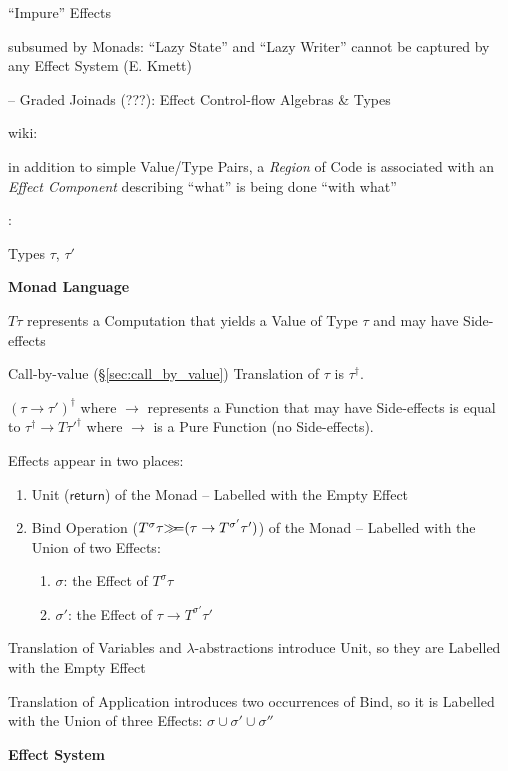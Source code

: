 ``Impure'' Effects

subsumed by Monads: ``Lazy State'' and ``Lazy Writer'' cannot be
captured by any Effect System (E. Kmett)

\cite{mycroft-orchard-petricek16} -- Graded Joinads (???): Effect
Control-flow Algebras \& Types

wiki:

in addition to simple Value/Type Pairs, a \emph{Region} of Code is
associated with an \emph{Effect Component} describing ``what'' is
being done ``with what''


\asterism


\cite{wadler-thiemann03}:

Types $\tau$, $\tau'$


\textbf{Monad Language}

$T \tau$ represents a Computation that yields a Value
of Type $\tau$ and may have Side-effects

Call-by-value (\S\ref{sec:call_by_value}) Translation of $\tau$ is
$\tau^\dag$.

$(\tau \rightarrow \tau')^\dag$ where $\rightarrow$ represents a
Function that may have Side-effects is equal to $\tau^\dag \rightarrow
T \tau'^\dag$ where $\rightarrow$ is a Pure Function (no Side-effects).

Effects appear in two places:
\begin{enumerate}
  \item Unit ($\mathsf{return}$) of the Monad -- Labelled with the
    Empty Effect
  \item Bind Operation ($T^\sigma\tau \mathsf{\gg\kern-3pt=} (\tau \rightarrow
    T^{\sigma'}\tau')$) of the Monad -- Labelled with the Union of two
    Effects: %
    \begin{enumerate}
      \item $\sigma$: the Effect of $T^\sigma\tau$
      \item $\sigma'$: the Effect of $\tau \rightarrow
        T^{\sigma'}\tau'$
    \end{enumerate}
\end{enumerate}

Translation of Variables and $\lambda$-abstractions introduce Unit, so
they are Labelled with the Empty Effect

Translation of Application introduces two occurrences of Bind, so it
is Labelled with the Union of three Effects: $\sigma \cup \sigma' \cup
\sigma''$ %


\textbf{Effect System}

